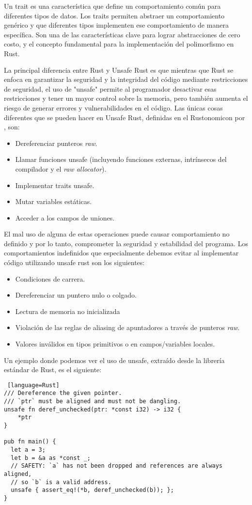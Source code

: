 Un trait es una característica que define un comportamiento común para diferentes tipos de datos. Los traits permiten abstraer un comportamiento genérico y que diferentes tipos implementen ese comportamiento de manera específica. Son una de las características clave para lograr abstracciones de cero costo, y el concepto fundamental para la implementación del polimorfismo en Rust.

La principal diferencia entre Rust y Unsafe Rust es que mientras que Rust se enfoca en garantizar la seguridad y la integridad del código mediante restricciones de seguridad, el uso de "unsafe" permite al programador desactivar esas restricciones y tener un mayor control sobre la memoria, pero también aumenta el riesgo de generar errores y vulnerabilidades en el código. Las únicas cosas diferentes que se pueden hacer en Unsafe Rust, definidas en el Rustonomicon por \cite{rustonomicon}, son:
\begin{itemize}[noitemsep]
  \item Dereferenciar punteros \textit{raw}.
  \item Llamar funciones unsafe (incluyendo funciones externas, intrínsecos del compilador y el \textit{raw allocator}).
  \item Implementar traits unsafe.
  \item Mutar variables estáticas.
  \item Acceder a los campos de uniones.
\end{itemize}
El mal uso de alguna de estas operaciones puede causar comportamiento no definido y por lo tanto, comprometer la seguridad y estabilidad del programa. Los comportamientos indefinidos que especialmente debemos evitar al implementar código utilizando unsafe rust son los siguientes:
\begin{itemize}[noitemsep]
  \item Condiciones de carrera.
  \item Dereferenciar un puntero nulo o colgado.
  \item Lectura de memoria no inicializada
  \item Violación de las reglas de aliasing de apuntadores a través de punteros \textit{raw}.
  \item Valores inválidos en tipos primitivos o en campos/variables locales.
\end{itemize}

Un ejemplo donde podemos ver el uso de unsafe, extraído desde la librería estándar de Rust, es el siguiente:
\begin{lstlisting} [language=Rust]
/// Dereference the given pointer.
/// `ptr` must be aligned and must not be dangling.
unsafe fn deref_unchecked(ptr: *const i32) -> i32 {
    *ptr
}

pub fn main() {
  let a = 3;
  let b = &a as *const _;
  // SAFETY: `a` has not been dropped and references are always aligned,
  // so `b` is a valid address.
  unsafe { assert_eq!(*b, deref_unchecked(b)); };
}
\end{lstlisting}

